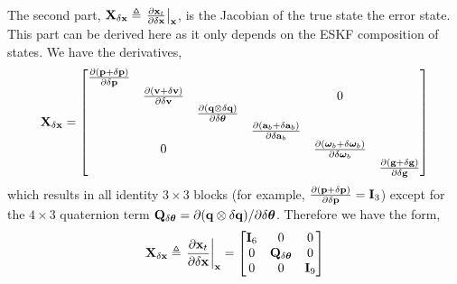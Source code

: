 The second part, ${\bf X}_{\delta{\bf x}}\triangleq\left.\frac{\partial{\bf x}_t}{\partial\delta{\bf x}}\right|_{{\bf x}}$, is the Jacobian of the true state \wrt the error state. 
This part can be derived here as it only depends on the ESKF composition of states. We have the derivatives,
%
\begin{equation}
{\bf X}_{\delta{\bf x}} = 
\begin{bmatrix}
\frac{\partial({\bf p}+\delta{\bf p})}{\partial\delta{\bf p}} &&&&& \\ 
& \frac{\partial({\bf v}+\delta{\bf v})}{\partial\delta{\bf v}} &&&0& \\ 
&& \frac{\partial({\bf q}\otimes\delta{\bf q})}{\partial\delta{\bm \theta}} &&& \\ 
&&& \frac{\partial({\bf a}_b+\delta{\bf a}_b)}{\partial\delta{\bf a}_b} && \\ 
&0&&& \frac{\partial({\bm \omega}_b+\delta{\bm \omega}_b)}{\partial\delta{\bm \omega}_b} & \\ 
&&&&& \frac{\partial({\bf g}+\delta{\bf g})}{\partial\delta{\bf g}} 
\end{bmatrix}
\end{equation}
%
which results in all identity $3\times3$ blocks (for example, $\frac{\partial({\bf p}+\delta{\bf p})}{\partial\delta{\bf p}}={\bf I}_3$) except for the $4\times3$ quaternion term ${\bf Q}_{\delta{\bm \theta}} = \partial({\bf q}\otimes\delta{\bf q})/\partial\delta{\bm \theta}$. Therefore we have the form,
%
\begin{equation}
{\bf X}_{\delta{\bf x}}\triangleq\left.\frac{\partial{\bf x}_t}{\partial\delta{\bf x}}\right|_{{\bf x}} = \begin{bmatrix}
{\bf I}_6 & 0 & 0 \\
0 &  {\bf Q}_{\delta{\bm \theta}} & 0 \\
0 & 0 & {\bf I}_9
\end{bmatrix}
\end{equation}


